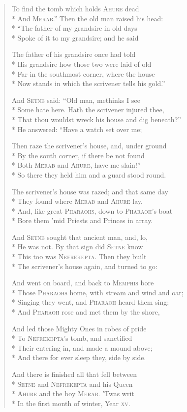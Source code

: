 \documentclass[12pt]{article}
\newcommand{\vin}{\hspace{1em}}
\begin{document}
\begin{verse}
To find the tomb which holds \textsc{Ahure} dead\\*
And \textsc{Merab}.'' Then the old man raised his head:\\*
\vin ``The father of my grandsire in old days\\*
Spoke of it to my grandsire; and he said

The father of his grandsire once had told\\*
His grandsire how those two were laid of old\\*
\vin Far in the southmost corner, where the house\\*
Now stands in which the scrivener tells his gold.''

And \textsc{Setne} said: ``Old man, methinks I see\\*
Some hate here. Hath the scrivener injured thee,\\*
\vin That thou wouldst wreck his house and dig beneath?''\\*
He answered: ``Have a watch set over me;

Then raze the scrivener's house, and, under ground\\*
By the south corner, if there be not found\\*
\vin Both \textsc{Merab} and \textsc{Ahure}, have me slain!''\\*
So there they held him and a guard stood round.

The scrivener's house was razed; and that same day\\*
They found where \textsc{Merab} and \textsc{Ahure} lay,\\*
\vin And, like great \textsc{Pharaohs}, down to \textsc{Pharaoh}'s boat\\*
Bore them 'mid Priests and Princes in array.

And \textsc{Setne} sought that ancient man, and, lo,\\*
He was not. By that sign did \textsc{Setne} know\\*
\vin This too was \textsc{Nefrekepta}. Then they built\\*
The scrivener's house again, and turned to go:

And went on board, and back to \textsc{Memphis} bore\\*
Those \textsc{Pharaohs} home, with stream and wind and oar;\\*
\vin Singing they went, and \textsc{Pharaoh} heard them sing;\\*
And \textsc{Pharaoh} rose and met them by the shore,

And led those Mighty Ones in robes of pride\\*
To \textsc{Nefrekepta}'s tomb, and sanctified\\*
\vin Their entering in, and made a mound above;\\*
And there for ever sleep they, side by side.

And there is finished all that fell between\\*
\textsc{Setne} and \textsc{Nefrekepta} and his Queen\\*
\vin \textsc{Ahure} and the boy \textsc{Merab}. 'Twas writ\\*
In the first month of winter, Year \textsc{xv}.
\end{verse}
\end{document}
